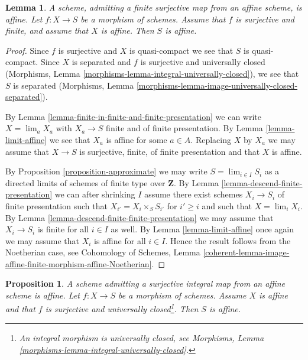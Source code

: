 \documentclass{stacks-project}
\newenvironment{slogan}{\comment}{\endcomment}
\theoremstyle{plain}
\newtheorem{proposition}[subsection]{Proposition}
\newtheorem{lemma}[subsection]{Lemma}
\theoremstyle{definition}
\theoremstyle{remark}
\numberwithin{equation}{subsection}
\def\lim{\mathop{\mathrm{lim}}\nolimits}
\begin{document}
\begin{lemma}
\label{lemma-affine}
\begin{slogan}
A scheme, admitting a finite surjective map from an affine scheme, is affine.
\end{slogan}
Let $f : X \to S$ be a morphism of schemes.
Assume that $f$ is surjective and finite, and assume that $X$ is affine.
Then $S$ is affine.
\end{lemma}

\begin{proof}
Since $f$ is surjective and $X$ is quasi-compact we see that $S$ is
quasi-compact. Since $X$ is separated and $f$ is surjective and
universally closed (Morphisms, Lemma
\ref{morphisms-lemma-integral-universally-closed}), we see that $S$
is separated (Morphisms, Lemma
\ref{morphisms-lemma-image-universally-closed-separated}).

\medskip\noindent
By Lemma \ref{lemma-finite-in-finite-and-finite-presentation}
we can write $X = \lim_a X_a$ with $X_a \to S$ finite and of finite
presentation. By Lemma \ref{lemma-limit-affine} we see that $X_a$
is affine for some $a \in A$. Replacing $X$ by $X_a$ we may assume
that $X \to S$ is surjective, finite, of finite presentation and
that $X$ is affine.

\medskip\noindent
By Proposition \ref{proposition-approximate} we may write
$S = \lim_{i \in I} S_i$ as
a directed limits of schemes of finite type over $\mathbf{Z}$.
By Lemma \ref{lemma-descend-finite-presentation} we can
after shrinking $I$ assume there exist schemes $X_i \to S_i$
of finite presentation such that $X_{i'} = X_i \times_S S_{i'}$
for $i' \geq i$ and such that $X = \lim_i X_i$. By
Lemma \ref{lemma-descend-finite-finite-presentation} we may
assume that $X_i \to S_i$ is finite for all $i \in I$ as well.
By Lemma \ref{lemma-limit-affine} once again we may assume that $X_i$ is
affine for all $i \in I$. Hence the result follows from the
Noetherian case, see Cohomology of Schemes,
Lemma \ref{coherent-lemma-image-affine-finite-morphism-affine-Noetherian}.
\end{proof}

\begin{proposition}
\label{proposition-affine}
\begin{slogan}
A scheme admitting a surjective integral map from an affine scheme is affine.
\end{slogan}
Let $f : X \to S$ be a morphism of schemes. Assume $X$ is affine
and that $f$ is surjective and universally closed\footnote{An integral
morphism is universally closed, see
Morphisms, Lemma \ref{morphisms-lemma-integral-universally-closed}.}.
Then $S$ is affine.
\end{proposition}
\end{document}
